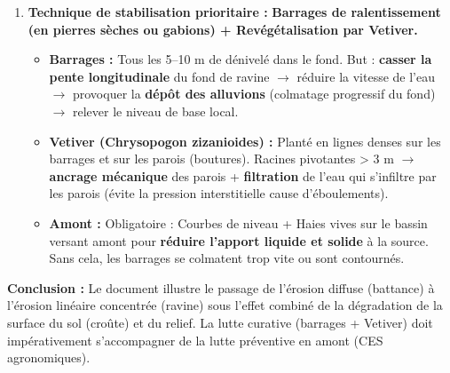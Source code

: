 \documentclass[11pt]{article}
\begin{document}
\begin{exoresolu}
\begin{enumerate}
\begin{enumerate}
            \item \textbf{Incision :} Le filet d'eau concentré a un pouvoir érosif (force de traction) bien supérieur au ruissellement diffus. Il entame le sol sous la croûte (horizon moins structuré) $\rightarrow$ creusement rapide en « V » par érosion régressive (tête de ravine qui remonte) et élargissement par éboulements des parois.
        \end{enumerate}
        \item \textbf{Technique de stabilisation prioritaire :}
        \textbf{Barrages de ralentissement (en pierres sèches ou gabions) + Revégétalisation par Vetiver.}
        \begin{itemize}
            \item \textbf{Barrages :} Tous les 5–10 m de dénivelé dans le fond. But : \textbf{casser la pente longitudinale} du fond de ravine $\rightarrow$ réduire la vitesse de l'eau $\rightarrow$ provoquer la \textbf{dépôt des alluvions} (colmatage progressif du fond) $\rightarrow$ relever le niveau de base local.
            \item \textbf{Vetiver (Chrysopogon zizanioides) :} Planté en lignes denses sur les barrages et sur les parois (boutures). Racines pivotantes > 3 m $\rightarrow$ \textbf{ancrage mécanique} des parois + \textbf{filtration} de l'eau qui s'infiltre par les parois (évite la pression interstitielle cause d'éboulements).
            \item \textbf{Amont :} Obligatoire : Courbes de niveau + Haies vives sur le bassin versant amont pour \textbf{réduire l'apport liquide et solide} à la source. Sans cela, les barrages se colmatent trop vite ou sont contournés.
        \end{itemize}
    \end{enumerate}
    \textbf{Conclusion :} Le document illustre le passage de l'érosion diffuse (battance) à l'érosion linéaire concentrée (ravine) sous l'effet combiné de la dégradation de la surface du sol (croûte) et du relief. La lutte curative (barrages + Vetiver) doit impérativement s'accompagner de la lutte préventive en amont (CES agronomiques).
\end{exoresolu}
\end{document}
